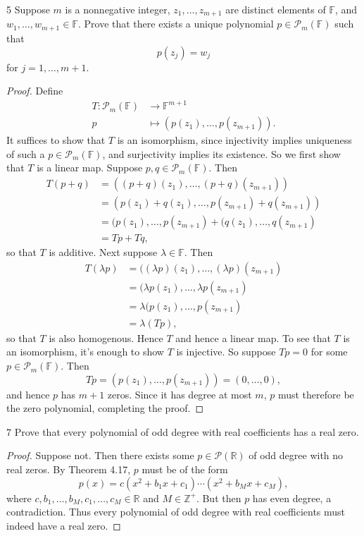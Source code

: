 \documentclass{extarticle}
\newenvironment{problem}[1]{\begin{prob*}{#1}{}}{\end{prob*}}
\newcommand{\Z}{\mathbb{Z}}
\newcommand{\R}{\mathbb{R}}
\newcommand{\F}{\mathbb{F}}
\newcommand{\poly}{\mathcal{P}}
\begin{document}
\begin{problem}{5}
Suppose $m$ is a nonnegative integer, $z_1,\dots, z_{m+1}$ are distinct elements of $\F$, and $w_1,\dots, w_{m+1}\in\F$.  Prove that there exists a unique polynomial $p\in\poly_m(\F)$ such that 
\begin{equation*}
p(z_j) = w_j
\end{equation*}
for $j = 1,\dots,m+1$.  
\end{problem}
\begin{proof}
Define 
\begin{align*}
T:\poly_m(\F)&\to \F^{m + 1}\\
    p &\mapsto (p(z_1), \dots, p(z_{m+1})).
\end{align*}
It suffices to show that $T$ is an isomorphism, since injectivity implies uniqueness of such a $p\in\poly_m(\F)$, and surjectivity implies its existence.  So we first show that $T$ is a linear map.  Suppose $p,q\in\poly_m(\F)$.  Then
\begin{align*}
T(p + q) &= ((p + q)(z_1), \dots, (p + q)(z_{m+1}))\\
&= (p(z_1) + q(z_1), \dots, p(z_{m+1}) + q(z_{m+1}))\\
&= (p(z_1), \dots, p(z_{m+1}) + (q(z_1), \dots, q(z_{m+1})\\
&= Tp + Tq,
\end{align*}
so that $T$ is additive.  Next suppose $\lambda\in\F$.  Then
\begin{align*}
T(\lambda p) &= ((\lambda p)(z_1), \dots, (\lambda p)(z_{m+1})\\
&= (\lambda p(z_1), \dots, \lambda p(z_{m+1})\\
&= \lambda (p(z_1), \dots, p(z_{m+1})\\
&= \lambda (Tp),
\end{align*}
so that $T$ is also homogenous.  Hence $T$ and hence a linear map.  To see that $T$ is an isomorphism, it's enough to show $T$ is injective.  So suppose $Tp = 0$ for some $p\in\poly_m(\F)$.  Then
\begin{equation*}
Tp = (p(z_1), \dots, p(z_{m+1})) = (0, \dots, 0),
\end{equation*}
and hence $p$ has $m + 1$ zeros.  Since it has degree at most $m$, $p$ must therefore be the zero polynomial, completing the proof.
\end{proof}

\begin{problem}{7}
Prove that every polynomial of odd degree with real coefficients has a real zero.
\end{problem}
\begin{proof}
Suppose not.  Then there exists some $p\in\poly(\R)$ of odd degree with no real zeros.  By Theorem 4.17, $p$ must be of the form
\begin{equation*}
p(x) = c(x^2 + b_1x + c_1)\cdots(x^2 + b_Mx + c_M),
\end{equation*}
where $c,b_1,\dots,b_M,c_1,\dots,c_M\in\R$ and $M\in\Z^+$.  But then $p$ has even degree, a contradiction.  Thus every polynomial of odd degree with real coefficients must indeed have a real zero.
\end{proof}
\end{document}
